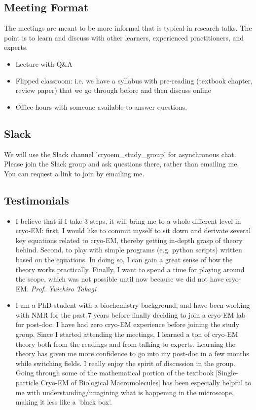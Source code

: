 \documentclass[11pt, oneside]{article}   	%
\begin{document}
\subsection{Meeting Format}
The meetings are meant to be more informal that is typical in research talks. The point is to learn and discuss with other learners, experienced practitioners, and experts.
\begin{itemize}
	\item Lecture with Q\&A
	\item Flipped classroom: i.e. we have a syllabus with pre-reading (textbook chapter, review paper) that we go through before and then discuss online
	\item Office hours with someone available to answer questions.
\end{itemize}

\subsection{Slack}
We will use the Slack channel 'cryoem\_study\_group' for asynchronous chat. Please join the Slack group and ask questions there, rather than emailing me. You can request a link to join by emailing me.

\subsection{Testimonials}

\begin{itemize}
	\item I believe that if I take 3 steps, it will bring me to a whole different level in cryo-EM: first, I would like to commit myself to sit down and derivate several key equations related to cryo-EM, thereby getting in-depth grasp of theory behind. Second, to play with simple programs (e.g. python scripts) written based on the equations. In doing so, I can gain a great sense of how the theory works practically. Finally, I want to spend a time for playing around the scope, which was not possible until now because we did not have cryo-EM. {\it Prof. Yuichiro Takagi}

	\item I am a PhD student with a biochemistry background, and have been working with NMR for the past 7 years before finally deciding to join a cryo-EM lab for post-doc. I have had zero cryo-EM experience before joining the study group. Since I started attending the meetings, I learned a ton of cryo-EM theory both from the readings and from talking to experts. Learning the theory has given me more confidence to go into my post-doc in a few months while switching fields. I really enjoy the spirit of discussion in the group. Going through some of the mathematical portion of the textbook [Single-particle Cryo-EM of Biological Macromolecules] has been especially helpful to me with understanding/imagining what is happening in the microscope, making it less like a 'black box'.
\end{itemize}
\end{document}
